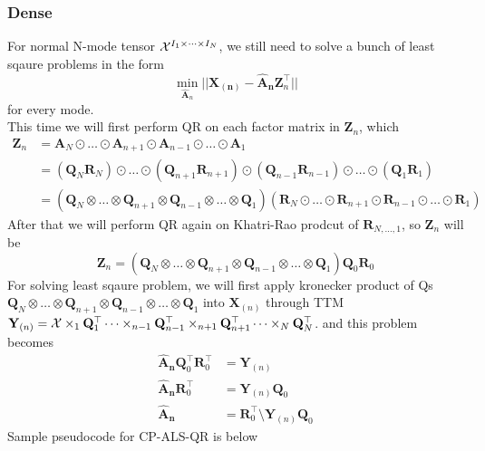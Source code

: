 \documentclass{article}
\newcommand{\mat}[1]{\mathbf{#1}}
\newcommand{\T}[2][]{#1{\mathbf{\cal{#2}}}} 						%
\begin{document}
\subsubsection{Dense}
For normal N-mode tensor $\T{X}^{I_1 \times \dots \times I_N}$, we still need to solve a bunch of least sqaure problems in the form
$$\min_{\mat{\hat{A}}_n}||\mat{X_{(n)}} - {\mat{\hat{A}_n}}\mat{Z}^\top_n ||$$
for every mode.\\
This time we will first perform QR on each factor matrix in $\mat{Z}_n$, which 
\begin{align}
  \mat{Z}_n &= \mat{A}_N \odot \dots \odot \mat{A}_{n+1} \odot \mat{A}_{n-1} \odot \dots \odot \mat{A}_1 \nonumber \\
  &= (\mat{Q}_N\mat{R}_N) \odot \dots \odot (\mat{Q}_{n+1}\mat{R}_{n+1}) \odot (\mat{Q}_{n-1}\mat{R}_{n-1}) \odot \dots \odot (\mat{Q}_1\mat{R}_1) \nonumber \\
  &= (\mat{Q}_N \otimes \dots \otimes \mat{Q}_{n+1} \otimes \mat{Q}_{n-1} \otimes \dots \otimes \mat{Q}_1)(\mat{R}_N \odot \dots \odot \mat{R}_{n+1} \odot \mat{R}_{n-1} \odot \dots \odot \mat{R}_1)\nonumber  
\end{align}
After that we will perform QR again on Khatri-Rao prodcut of $\mat{R}_{N,\dots,1}$, so $\mat{Z}_n$ will be
$$\mat{Z}_n = (\mat{Q}_N \otimes \dots \otimes \mat{Q}_{n+1} \otimes \mat{Q}_{n-1} \otimes \dots \otimes \mat{Q}_1)\mat{Q}_0\mat{R}_0$$
For solving least sqaure problem, we will first apply kronecker product of Qs 
$\mat{Q}_N \otimes \dots \otimes \mat{Q}_{n+1} \otimes \mat{Q}_{n-1} \otimes \dots \otimes \mat{Q}_1$ into $\mat{X}_{(n)}$ through TTM 
$\mat{Y}_{(n)} =  \T{X} \times_1 \mat{Q}_1^\top \dots \times_{n-1} \mat{Q}_{n-1}^\top \times_{n+1} \mat{Q}_{n+1}^\top \dots \times_N \mat{Q}_N^\top$.
and this problem becomes
\begin{align}
  \mat{\hat{A}_n}\mat{Q}_0^\top \mat{R}_0^\top &= \mat{Y}_{(n)} \nonumber \\
  \mat{\hat{A}_n}\mat{R}_0^\top &= \mat{Y}_{(n)} \mat{Q}_0 \nonumber \\
  \mat{\hat{A}_n} &= \mat{R}_0^\top \text{\textbackslash} \mat{Y}_{(n)} \mat{Q}_0 \nonumber
\end{align}
Sample pseudocode for CP-ALS-QR is below
\end{document}
